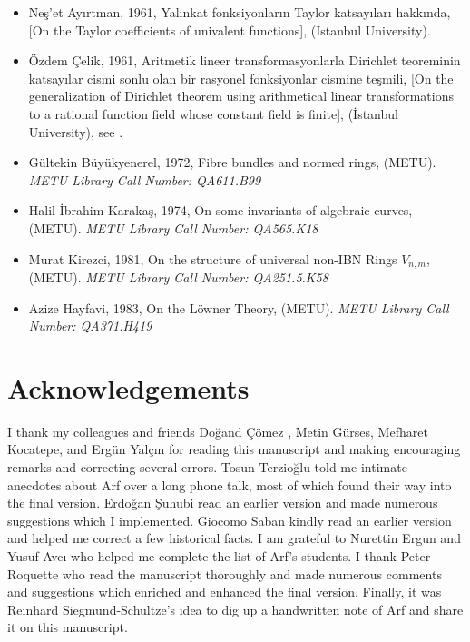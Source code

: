 \documentclass[12pt]{amsart}
\begin{document}
\begin{itemize}
({\.I}stanbul University).
\\
\item Ne\c{s}'et Ay{\i}rtman, 1961, Yal{\i}nkat fonksiyonlar{\i}n Taylor katsay{\i}lar{\i} hakk{\i}nda, [On the Taylor coefficients of univalent functions],
({\.I}stanbul University).
\\
\item \"{O}zdem \c{C}elik, 1961, Aritmetik lineer transformasyonlarla Dirichlet teoreminin katsay{\i}lar cismi sonlu olan bir rasyonel fonksiyonlar cismine te\c{s}mili, [On the generalization of Dirichlet theorem using arithmetical linear transformations to a rational function field whose constant field is finite],
({\.I}stanbul University), see \cite{celik}.
\\
\item G\"{u}ltekin B\"{u}y\"{u}kyenerel, 1972, Fibre bundles and normed rings, (METU).
{\it \small METU Library Call Number: QA611.B99}
\\
\item Halil {\.I}brahim Karaka\c{s}, 1974, On some invariants of algebraic curves,  (METU).
{\it \small METU Library Call Number: QA565.K18}
\\
\item Murat Kirezci, 1981, On the structure of universal non-IBN Rings $V_{n,m}$, (METU).
{\it \small METU Library Call Number: QA251.5.K58}
\\
\item Azize Hayfavi, 1983, On the L\"{o}wner Theory, (METU).
{\it \small METU Library Call Number: QA371.H419}
\end{itemize}

\section{Acknowledgements}
I thank my colleagues and friends Do\u{g}and \c{C}\"{o}mez , Metin G\"{u}rses, Mefharet Kocatepe, and  Erg\"{u}n Yal\c{c}{\i}n for reading  this manuscript and making encouraging remarks and correcting several errors. Tosun Terzio\u{g}lu told me  intimate anecdotes about Arf over a long phone talk, most of which found their way into the final version. Erdo\u{g}an \c{S}uhubi read an earlier version and made numerous suggestions which I implemented. Giocomo Saban kindly read an earlier version and  helped me correct a few historical facts. I am grateful to Nurettin Ergun and Yusuf Avc{\i} who helped me complete the list of Arf's students. I thank Peter Roquette who read the manuscript thoroughly and made numerous comments and suggestions which enriched and enhanced the final version. Finally, it was Reinhard Siegmund-Schultze's idea to dig up a handwritten note of Arf and share it on this manuscript.
\end{document}
